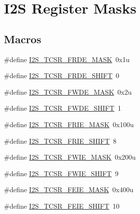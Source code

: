 \hypertarget{group___i2_s___register___masks}{}\section{I2S Register Masks}
\label{group___i2_s___register___masks}
\subsection*{Macros}
\begin{DoxyCompactItemize}
\item 
\#define \hyperlink{group___i2_s___register___masks_gae565812ade16ef43b2c8de0da9434dc7}{I2\+S\+\_\+\+T\+C\+S\+R\+\_\+\+F\+R\+D\+E\+\_\+\+M\+A\+SK}~0x1u
\item 
\#define \hyperlink{group___i2_s___register___masks_ga625ff0e116f205afc5810d46b33889e8}{I2\+S\+\_\+\+T\+C\+S\+R\+\_\+\+F\+R\+D\+E\+\_\+\+S\+H\+I\+FT}~0
\item 
\#define \hyperlink{group___i2_s___register___masks_ga1ee38c9bb8913b7ad39101588a3b6f81}{I2\+S\+\_\+\+T\+C\+S\+R\+\_\+\+F\+W\+D\+E\+\_\+\+M\+A\+SK}~0x2u
\item 
\#define \hyperlink{group___i2_s___register___masks_ga711259f1f84d00f66491a4369794c9be}{I2\+S\+\_\+\+T\+C\+S\+R\+\_\+\+F\+W\+D\+E\+\_\+\+S\+H\+I\+FT}~1
\item 
\#define \hyperlink{group___i2_s___register___masks_gaa4df5fe488cb4d2acb0bfd546f660507}{I2\+S\+\_\+\+T\+C\+S\+R\+\_\+\+F\+R\+I\+E\+\_\+\+M\+A\+SK}~0x100u
\item 
\#define \hyperlink{group___i2_s___register___masks_gae80718274a142dbe1c9b84baddb880fe}{I2\+S\+\_\+\+T\+C\+S\+R\+\_\+\+F\+R\+I\+E\+\_\+\+S\+H\+I\+FT}~8
\item 
\#define \hyperlink{group___i2_s___register___masks_ga4cd03b204167fc3671c12fa3462d38fb}{I2\+S\+\_\+\+T\+C\+S\+R\+\_\+\+F\+W\+I\+E\+\_\+\+M\+A\+SK}~0x200u
\item 
\#define \hyperlink{group___i2_s___register___masks_ga666587a04effa8fc8ff5411eacbee7db}{I2\+S\+\_\+\+T\+C\+S\+R\+\_\+\+F\+W\+I\+E\+\_\+\+S\+H\+I\+FT}~9
\item 
\#define \hyperlink{group___i2_s___register___masks_ga396da367b36ad3ece4724ee59140968f}{I2\+S\+\_\+\+T\+C\+S\+R\+\_\+\+F\+E\+I\+E\+\_\+\+M\+A\+SK}~0x400u
\item 
\#define \hyperlink{group___i2_s___register___masks_ga6115a14264154cbd0f1b604dbe873a14}{I2\+S\+\_\+\+T\+C\+S\+R\+\_\+\+F\+E\+I\+E\+\_\+\+S\+H\+I\+FT}~10
\item 

\end{DoxyCompactItemize}
